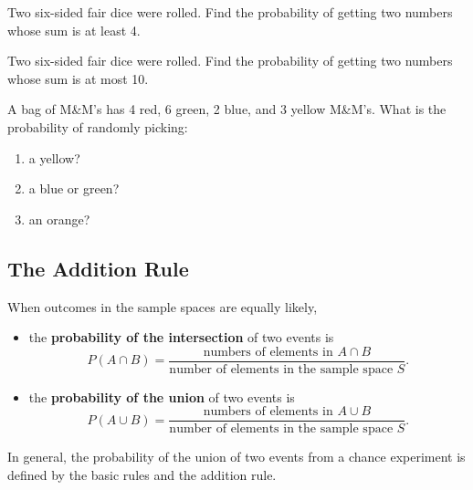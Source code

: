 \begin{example}

Two six-sided fair dice were rolled. Find the probability of getting two
numbers whose sum is at least 4.

\end{example}
\vspace*{5\baselineskip}

\begin{exercise}

Two six-sided fair dice were rolled. Find the probability of getting two numbers whose sum is at most 10.

\end{exercise}

\begin{exercise}

A bag of M\&M's has 4 red, 6 green, 2 blue, and 3 yellow M\&M's. What is the probability of randomly picking:

\begin{enumerate}
  \item a yellow?
  \item a blue or green?
  \item an orange?
\end{enumerate}
  
\end{exercise}

\hypertarget{the-addition-rule}{%
\subsection{The Addition Rule}\label{the-addition-rule}}

When outcomes in the sample spaces are equally likely,

\begin{itemize}
\item
  the \textbf{probability of the intersection} of two events is \[
  P(A\cap B)=\dfrac{\text{numbers of elements in } A\cap B}{\text{number of elements in the sample space }S}.
  \]
\item
  the \textbf{probability of the union} of two events is \[
  P(A\cup B)=\dfrac{\text{numbers of elements in } A\cup B}{\text{number of elements in the sample space }S}.
  \]
\end{itemize}

In general, the probability of the union of two events from a chance
experiment is defined by the basic rules and the addition rule.


